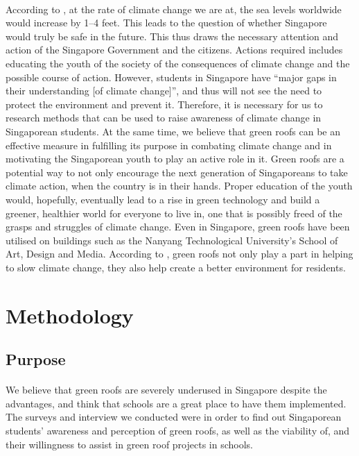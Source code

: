 \documentclass{article}
\begin{document}
\begin{multicols}{2}
  \paragraph{} According to \cite{nasa}, at the rate of climate
  change we are at, the sea levels worldwide would increase by 1--4
  feet. This leads to the question of whether Singapore would truly
  be safe in the future. This thus draws the necessary attention and
  action of the Singapore Government and the citizens. Actions required
  includes educating the youth of the society of the consequences of
  climate change and the possible course of action.  However, students
  in Singapore have ``major gaps in their understanding [of climate
  change]''\parencite{student_carbon_footprint}, and thus will not
  see the need to protect the environment and prevent it. Therefore,
  it is necessary for us to research methods that can be used to raise
  awareness of climate change in Singaporean students. At the same
  time, we believe that green roofs can be an effective measure in
  fulfilling its purpose in combating climate change and in motivating
  the Singaporean youth to play an active role in it. Green roofs are a
  potential way to not only encourage the next generation of Singaporeans
  to take climate action,  when the country is in their hands. Proper
  education of the youth would, hopefully, eventually lead to a rise in
  green technology and build a greener, healthier world for everyone
  to live in, one that is possibly freed of the grasps and struggles
  of climate change. Even in Singapore, green roofs have been utilised
  on buildings such as the Nanyang Technological University’s School
  of Art, Design and Media. According to \cite{greenbuild_advant1},
  green roofs not only play a part in helping to slow climate change,
  they also help create a better environment for residents.




  \section{Methodology}
  \subsection{Purpose}
  \paragraph{} We believe that green roofs are severely underused
  in Singapore despite the advantages, and think that schools are a
  great place to have them implemented. The surveys and interview we
  conducted were in order to find out Singaporean students’ awareness
  and perception of green roofs, as well as the viability of, and their
  willingness to assist in green roof projects in schools.


\end{multicols}
\end{document}
